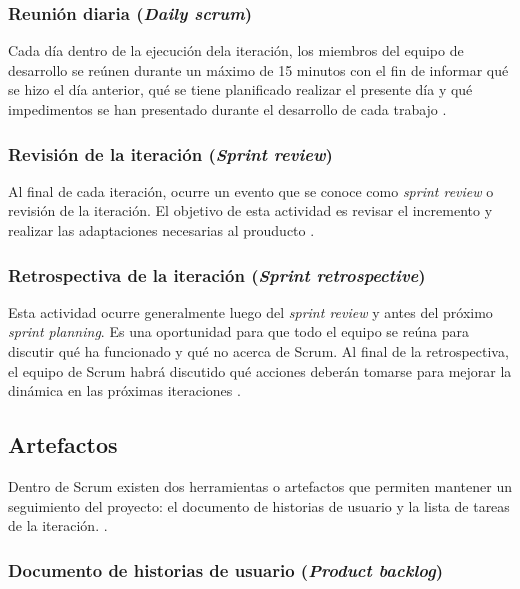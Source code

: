 \subsubsection{Reunión diaria (\textit{Daily scrum})}

Cada día dentro de la ejecución dela iteración, los miembros del equipo de desarrollo se reúnen durante un máximo de 15 minutos con el fin de informar qué se hizo el día anterior, qué se tiene planificado realizar el presente día y qué impedimentos se han presentado durante el desarrollo de cada trabajo \cite{SCRM12}.

\subsubsection{Revisión de la iteración (\textit{Sprint review})}

Al final de cada iteración, ocurre un evento que se conoce como \textit{sprint review} o revisión de la iteración. El objetivo de esta actividad es revisar el incremento y realizar las adaptaciones necesarias al prouducto \cite{SCRM12}.

\subsubsection{Retrospectiva de la iteración (\textit{Sprint retrospective})}

Esta actividad ocurre generalmente luego del \textit{sprint review} y antes del próximo \textit{sprint planning}. Es una oportunidad para que todo el equipo se reúna para discutir qué ha funcionado y qué no acerca de Scrum. Al final de la retrospectiva, el equipo de Scrum habrá discutido qué acciones deberán tomarse para mejorar la dinámica en las próximas iteraciones \cite{SCRM2}. 

\subsection{Artefactos}

Dentro de Scrum existen dos herramientas o artefactos que permiten mantener un seguimiento del proyecto: el documento de historias de usuario y la lista de tareas de la iteración. \cite{SCRM2}.

\subsubsection{Documento de historias de usuario (\textit{Product backlog})}

